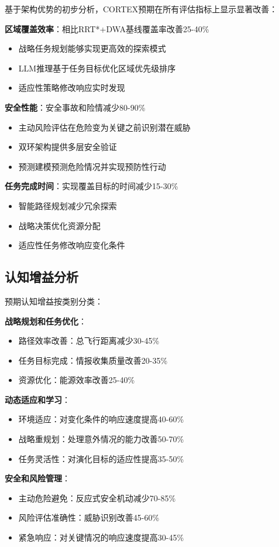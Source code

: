 基于架构优势的初步分析，CORTEX预期在所有评估指标上显示显著改善：

\textbf{区域覆盖效率}：相比RRT*+DWA基线覆盖率改善25-40\%
\begin{itemize}
\item 战略任务规划能够实现更高效的探索模式
\item LLM推理基于任务目标优化区域优先级排序
\item 适应性策略修改响应实时发现
\end{itemize}

\textbf{安全性能}：安全事故和险情减少80-90\%
\begin{itemize}
\item 主动风险评估在危险变为关键之前识别潜在威胁
\item 双环架构提供多层安全验证
\item 预测建模预测危险情况并实现预防性行动
\end{itemize}

\textbf{任务完成时间}：实现覆盖目标的时间减少15-30\%
\begin{itemize}
\item 智能路径规划减少冗余探索
\item 战略决策优化资源分配
\item 适应性任务修改响应变化条件
\end{itemize}

\subsection{认知增益分析}

预期认知增益按类别分类：

\textbf{战略规划和任务优化}：
\begin{itemize}
\item 路径效率改善：总飞行距离减少30-45\%
\item 任务目标完成：情报收集质量改善20-35\%
\item 资源优化：能源效率改善25-40\%
\end{itemize}

\textbf{动态适应和学习}：
\begin{itemize}
\item 环境适应：对变化条件的响应速度提高40-60\%
\item 战略重规划：处理意外情况的能力改善50-70\%
\item 任务灵活性：对演化目标的适应性提高35-50\%
\end{itemize}

\textbf{安全和风险管理}：
\begin{itemize}
\item 主动危险避免：反应式安全机动减少70-85\%
\item 风险评估准确性：威胁识别改善45-60\%
\item 紧急响应：对关键情况的响应速度提高30-45\%
\end{itemize}

